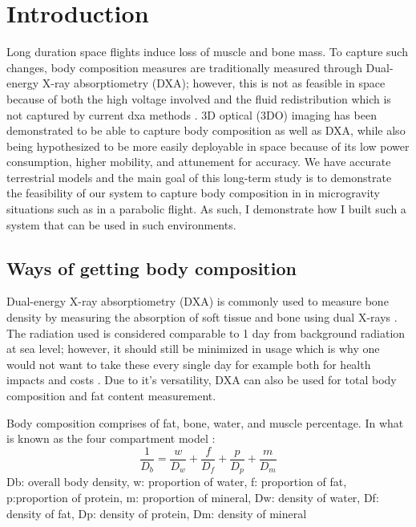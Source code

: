 

\chapter{Introduction}

Long duration space flights induce loss of muscle and bone mass. To capture such changes, body composition measures are traditionally measured through Dual-energy X-ray absorptiometry (DXA); however, this is not as feasible in space because of both the high voltage involved and the fluid redistribution which is not captured by current dxa methods \cite{sibonga2015evaluating}. 3D optical (3DO) imaging has been demonstrated to be able to capture body composition as well as DXA, while also being hypothesized to be more easily deployable in space because of its low power consumption, higher mobility, and attunement for accuracy. We have accurate terrestrial models and the main goal of this long-term study is to demonstrate the feasibility of our system to capture body composition in in microgravity situations such as in a parabolic flight. As such, I demonstrate how I built such a system that can be used in such environments. 
\section{Ways of getting body composition}
Dual-energy X-ray absorptiometry (DXA) is commonly used to measure bone density by measuring the absorption of soft tissue and bone using dual X-rays \cite{albanese2003clinical}. The radiation used is considered comparable to 1 day from background radiation at sea level; however, it should still be minimized in usage which is why one would not want to take these every single day for example both for health impacts and costs \cite{damilakis2010radiation}. Due to it's versatility, DXA can also be used for total body composition and fat content measurement.

Body composition comprises of fat, bone, water, and muscle percentage. In what is known as the four compartment model \cite{fuller1992four}:
\begin{equation}
	\frac{1}{D_b} = \frac{w}{D_w} + \frac{f}{D_f} + \frac{p}{D_p} + \frac{m}{D_m}
\end{equation}
Db: overall body density, w: proportion of water, f: proportion of fat, p:proportion of protein, m: proportion of mineral, Dw: density of water, Df: density of fat, Dp: density of protein, Dm: density of mineral


